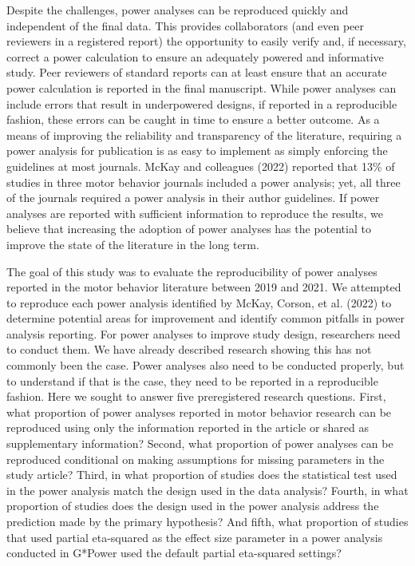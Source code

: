 \documentclass[
  doc, donotrepeattitle,floatsintext]{apa7}
\begin{document}
Despite the challenges, power analyses can be reproduced quickly and independent of the final data. This provides collaborators (and even peer reviewers in a registered report) the opportunity to easily verify and, if necessary, correct a power calculation to ensure an adequately powered and informative study. Peer reviewers of standard reports can at least ensure that an accurate power calculation is reported in the final manuscript. While power analyses can include errors that result in underpowered designs, if reported in a reproducible fashion, these errors can be caught in time to ensure a better outcome. As a means of improving the reliability and transparency of the literature, requiring a power analysis for publication is as easy to implement as simply enforcing the guidelines at most journals. McKay and colleagues (2022) reported that 13\% of studies in three motor behavior journals included a power analysis; yet, all three of the journals required a power analysis in their author guidelines. If power analyses are reported with sufficient information to reproduce the results, we believe that increasing the adoption of power analyses has the potential to improve the state of the literature in the long term.

The goal of this study was to evaluate the reproducibility of power analyses reported in the motor behavior literature between 2019 and 2021. We attempted to reproduce each power analysis identified by McKay, Corson, et al. (2022) to determine potential areas for improvement and identify common pitfalls in power analysis reporting. For power analyses to improve study design, researchers need to conduct them. We have already described research showing this has not commonly been the case. Power analyses also need to be conducted properly, but to understand if that is the case, they need to be reported in a reproducible fashion. Here we sought to answer five preregistered research questions. First, what proportion of power analyses reported in motor behavior research can be reproduced using only the information reported in the article or shared as supplementary information? Second, what proportion of power analyses can be reproduced conditional on making assumptions for missing parameters in the study article? Third, in what proportion of studies does the statistical test used in the power analysis match the design used in the data analysis? Fourth, in what proportion of studies does the design used in the power analysis address the prediction made by the primary hypothesis? And fifth, what proportion of studies that used partial eta-squared as the effect size parameter in a power analysis conducted in G*Power used the default partial eta-squared settings?
\end{document}
